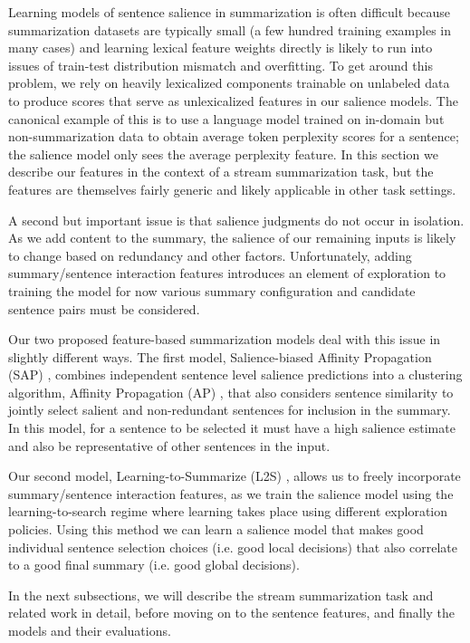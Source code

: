 Learning models of sentence salience in summarization is often difficult
because summarization datasets are typically small (a few hundred training
examples in many cases) and learning lexical 
feature weights directly is likely to run into issues of train-test distribution mismatch and 
overfitting. 
To get around this problem, we rely on heavily lexicalized components 
trainable on unlabeled data to produce scores that serve as unlexicalized 
features in our salience models. The canonical example of this is to use 
a language model trained on in-domain but non-summarization data to 
obtain average token perplexity scores for a sentence; the salience model
only sees the average perplexity feature. 
In this section we 
describe our features in the context of a stream summarization task, but the 
features are themselves fairly generic and likely applicable in other task
settings.

A second but important issue is that salience judgments do not occur
in isolation. As we add content to the summary, the salience
of our remaining inputs is likely to change based on redundancy and other 
factors.
Unfortunately, adding summary/sentence interaction features introduces an element of 
exploration to training the model for now various summary configuration 
and candidate sentence pairs must be considered.

Our two proposed feature-based summarization models deal with this
issue in slightly different ways. 
The first model, Salience-biased Affinity Propagation (SAP) 
\citep{kedzie2015predicting}, combines 
independent sentence level salience predictions into a clustering algorithm,
Affinity Propagation (AP) \citep{frey2007clustering}, that also 
considers sentence similarity to jointly select salient and 
non-redundant sentences for inclusion in the summary. In this model, for 
a sentence to be selected it must have a high salience estimate
and also be
representative of other sentences in the input.

Our second model, Learning-to-Summarize (L2S) \citep{kedzie2016real}, allows 
us to freely incorporate summary/sentence interaction
features, as we train the salience model using the learning-to-search regime
\citep{daume2009search,chang2015learning}
where learning takes place using different exploration policies. Using 
this method we can learn a salience model that makes good individual sentence
selection choices (i.e. good local decisions) that also correlate to a good 
final summary (i.e. good global decisions). 

In the next subsections, we will describe the stream summarization task
and related work 
in detail, before moving on to the sentence features, and finally the models
and their evaluations.


